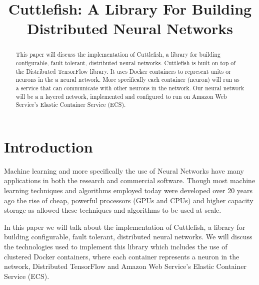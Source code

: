\documentclass[conference]{IEEEtran}
\begin{document}
\title{Cuttlefish: A Library For Building Distributed Neural Networks}

\author{
}
\maketitle

\maketitle

\begin{abstract}
This paper will discuss the implementation of Cuttlefish, a library for building configurable, fault tolerant, distributed neural networks. Cuttlefish is built on top of the Distributed TensorFlow library. It uses Docker containers to represent units or neurons in the a neural network. More specifically each container (neuron) will run as a service that can communicate with other neurons in the network. Our neural network will be a n layered network, implemented and configured to run on Amazon Web Service's Elastic Container Service (ECS).
\end{abstract}

\IEEEpeerreviewmaketitle



\section{Introduction}
Machine learning and more specifically the use of Neural Networks have many applications in both the research and commercial software. Though most machine learning techniques and algorithms employed today were developed over 20 years ago the rise of cheap, powerful processors (GPUs and CPUs) and higher capacity storage as allowed these techniques and algorithms to be used at scale.

In this paper we will talk about the implementation of Cuttlefish, a library for building configurable, fault tolerant, distributed neural networks. We will discuss the technologies used to implement this library which includes the use of clustered Docker containers, where each container represents a neuron in the network, Distributed TensorFlow and Amazon Web Service's Elastic Container Service (ECS).
\end{document}
